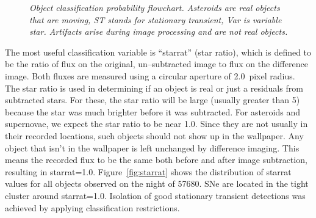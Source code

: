 \documentclass[aps,prb,twocolumn,superscriptaddress]{revtex4-1}
\begin{document}
\begin{figure}[h!]%
 \caption{\it \small{Object classification probability flowchart.  Asteroids are real objects that are moving, ST stands for stationary transient, Var is variable star. Artifacts arise during image processing and are not real objects.\label{fig:probflow}}}
\end{figure}

The most useful classification variable is ``starrat'' (star ratio), 
which is defined to be the ratio of flux on the original, un--subtracted 
image to flux on the difference image.  Both fluxes are measured using a 
circular aperture of 2.0~pixel radius.  The star ratio is used in 
determining if an object is real or just a residuals from subtracted stars.  
For these, the star ratio will be large (usually greater than 5) because 
the star was much brighter before it was subtracted.  For asteroids and 
supernovae, we expect the star ratio to be near 1.0.  Since they are not 
usually in their recorded locations, such objects should not show up in the wallpaper.  
Any object that isn't in the wallpaper is left unchanged by difference imaging.  
This means the recorded flux to be the same both before and after image subtraction, 
resulting in starrat=1.0.  Figure~\ref{fig:starrat} shows the distribution of starrat 
values for all objects observed on the night of 57680.  SNe are located in the 
tight cluster around starrat=1.0.  Isolation of good stationary transient detections 
was achieved by applying classification restrictions.
\end{document}
